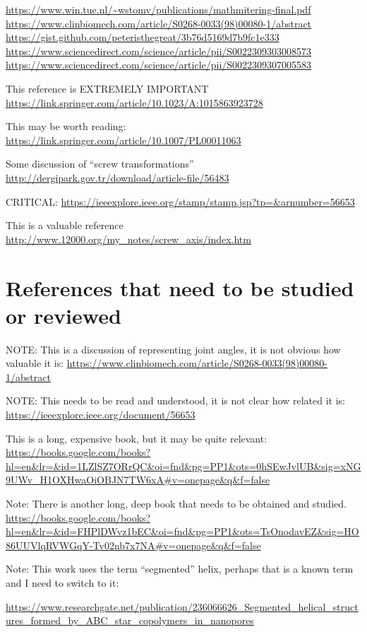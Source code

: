 \documentclass[11pt]{article}
\begin{document}
{\url{https://www.win.tue.nl/~wstomv/publications/mathmitering-final.pdf}
\url{https://www.clinbiomech.com/article/S0268-0033(98)00080-1/abstract}
\url{https://gist.github.com/peteristhegreat/3b76d5169d7b9fc1e333}
\url{https://www.sciencedirect.com/science/article/pii/S0022309303008573}
\url{https://www.sciencedirect.com/science/article/pii/S0022309307005583}

This reference is EXTREMELY IMPORTANT
\url{https://link.springer.com/article/10.1023/A:1015863923728}



This may be worth reading:
\url{https://link.springer.com/article/10.1007/PL00011063}


Some discussion of ``screw transformations''
\url{http://dergipark.gov.tr/download/article-file/56483}

CRITICAL:
\url{https://ieeexplore.ieee.org/stamp/stamp.jsp?tp=&arnumber=56653}


This is a valuable reference
\url{http://www.12000.org/my_notes/screw_axis/index.htm}

\section{References that need to be studied or reviewed}

NOTE: This is a discussion of representing joint angles, it is not obvious how valuable it is:
\url{https://www.clinbiomech.com/article/S0268-0033(98)00080-1/abstract}

NOTE: This needs to be read and understood, it is not clear how related it is:
\url{https://ieeexplore.ieee.org/document/56653}

This is a long, expensive book, but it may be quite relevant\cite{hyde1996language}:
\url{https://books.google.com/books?hl=en&lr=&id=1LZlSZ7ORrQC&oi=fnd&pg=PP1&ots=0hSEwJvlUB&sig=xNG9UWv_H1OXHwaOiOBJN7TW6xA#v=onepage&q&f=false}

Note: There is another long, deep book that needs to be obtained and studied\cite{sadoc2006geometrical}.
\url{https://books.google.com/books?hl=en&lr=&id=FHPlDWvz1bEC&oi=fnd&pg=PP1&ots=TsOnodavEZ&sig=HO86UUVlqRVWGqY-Tv02nb7x7NA#v=onepage&q&f=false}


Note: This work uses the term ``segmented'' helix, perhaps that is a known term and I need to switch to it:

\url{https://www.researchgate.net/publication/236066626_Segmented_helical_structures_formed_by_ABC_star_copolymers_in_nanopores}

}
\end{document}

